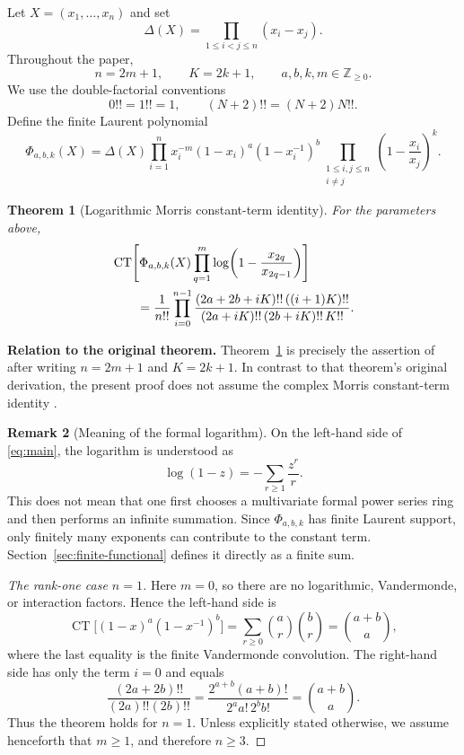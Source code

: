 \documentclass[11pt,a4paper]{article}
\newtheorem{theorem}{Theorem}[section]
\theoremstyle{definition}
\newtheorem{remark}[theorem]{Remark}
\newcommand{\CT}{\operatorname{CT}}
\begin{document}
Let $X=(x_1,\ldots,x_n)$ and set
\[
  \Delta(X)=\prod_{1\le i<j\le n}(x_i-x_j).
\]
Throughout the paper,
\[
  n=2m+1,\qquad K=2k+1,\qquad
  a,b,k,m\in\mathbb Z_{\ge 0}.
\]
We use the double-factorial conventions
\[
  0!!=1!!=1,\qquad (N+2)!!=(N+2)N!!.
\]
Define the finite Laurent polynomial
\begin{equation}\label{eq:kernel}
\Phi_{a,b,k}(X)
=\Delta(X)\prod_{i=1}^{n}x_i^{-m}(1-x_i)^a(1-x_i^{-1})^b
 \prod_{\substack{1\le i,j\le n\\i\ne j}}
 \left(1-\frac{x_i}{x_j}\right)^k .
\end{equation}

\begin{theorem}[Logarithmic Morris constant-term identity]\label{thm:main}
For the parameters above,
\begin{align}
&\CT\!\left[
 \Phi_{a,b,k}(X)
 \prod_{q=1}^{m}\log\!\left(1-\frac{x_{2q}}{x_{2q-1}}\right)
\right]\notag\\
&\qquad=
\frac1{n!!}\prod_{i=0}^{n-1}
\frac{(2a+2b+iK)!!\,((i+1)K)!!}
{(2a+iK)!!\,(2b+iK)!!\,K!!}.
\label{eq:main}
\end{align}
\end{theorem}

\noindent\textbf{Relation to the original theorem.}
Theorem~\ref{thm:main} is precisely the assertion of
\cite[Theorem~1.3]{LogMorris} after writing $n=2m+1$ and $K=2k+1$.
In contrast to that theorem's original derivation, the present proof does
not assume the complex Morris constant-term identity
\cite[(4.5)]{LogMorris}.

\begin{remark}[Meaning of the formal logarithm]\label{rem:formal-log}
On the left-hand side of \eqref{eq:main}, the logarithm is understood as
\[
  \log(1-z)=-\sum_{r\ge1}\frac{z^r}{r}.
\]
This does not mean that one first chooses a multivariate formal power
series ring and then performs an infinite summation. Since
$\Phi_{a,b,k}$ has finite Laurent support, only finitely many exponents can
contribute to the constant term. Section~\ref{sec:finite-functional}
defines it directly as a finite sum.
\end{remark}

\begin{proof}[The rank-one case $n=1$]
Here $m=0$, so there are no logarithmic, Vandermonde, or interaction
factors. Hence the left-hand side is
\[
 \CT\bigl[(1-x)^a(1-x^{-1})^b\bigr]
 =\sum_{r\ge0}\binom ar\binom br
 =\binom{a+b}{a},
\]
where the last equality is the finite Vandermonde convolution. The
right-hand side has only the term $i=0$ and equals
\[
 \frac{(2a+2b)!!}{(2a)!!(2b)!!}
 =\frac{2^{a+b}(a+b)!}{2^aa!\,2^bb!}
 =\binom{a+b}{a}.
\]
Thus the theorem holds for $n=1$. Unless explicitly stated otherwise, we
assume henceforth that $m\ge1$, and therefore $n\ge3$.
\end{proof}
\end{document}
